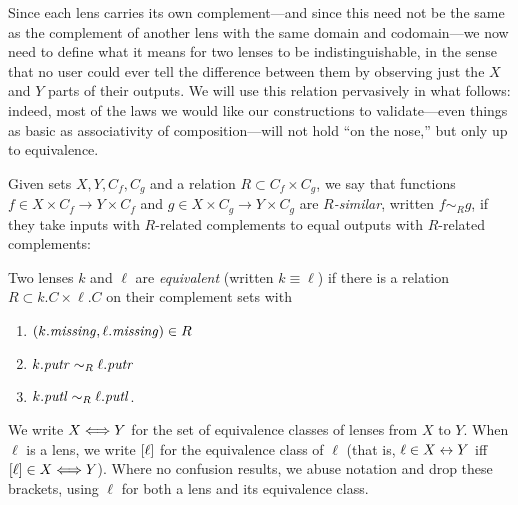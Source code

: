 \iftext 
Since each lens carries its own complement---and since this need
not be the same as the 
complement of another lens with the same domain and codomain---we now need to
define what it means for two lenses to be indistinguishable, in the sense
that no user could ever tell the difference between them by observing just the
$X$ and $Y$ parts of their outputs.  We will use this relation pervasively
in what follows: indeed, most of the laws we would like our constructions to
validate---even things as basic as associativity of composition---will not
hold ``on the nose,'' but only up to equivalence. 
\fi

\iffull
\begin{defn}[$R$-similarity]
\else
\begin{defn}
\fi
Given \iffull sets \fi $X,Y,C_f,C_g$ and a relation $R \subset C_f \times C_g$,
we say that functions 
$f \in X \times C_f \to Y \times C_f$ and $g \in X \times C_g \to Y \times C_g$
are {\em $R$-similar}, written $f \sim_R g$, if they take inputs with $R$-related
complements to equal outputs with $R$-related complements:
\end{defn}

\begin{defn}
Two lenses $k$ and $\ell$ are {\em equivalent} (written $k \equiv \ell$) if
there is a relation $R \subset k.C \times \ell.C$ \iffull on their complement
sets \fi with
\begin{enumerate}
    \item $(k.\mathit{missing}, \ell.\mathit{missing}) \in R$
    \item $k.\mathit{putr} \sim_R \ell.\mathit{putr}$
    \item $k.\mathit{putl} \sim_R \ell.\mathit{putl}$.
\end{enumerate}
We write $X \Longleftrightarrow Y$ for the set of equivalence classes of lenses from $X$
to $Y$.  When $\ell$ is a lens, we write $[\ell]$ for the
equivalence class of $\ell$ (that is, $\ell \in X\leftrightarrow Y$ iff
$[\ell] \in X\Longleftrightarrow Y$).  Where no confusion results, we 
abuse notation and drop these brackets, using $\ell$ for both a lens and
its equivalence class.
\end{defn}


\end{defn}
